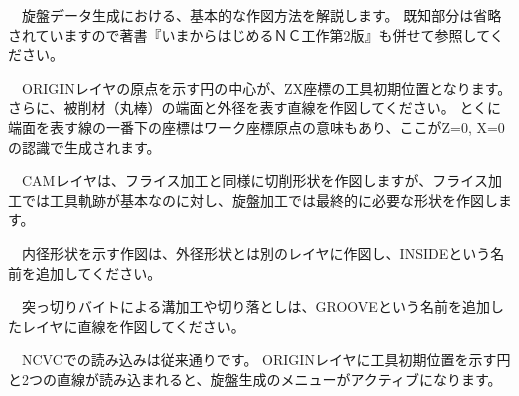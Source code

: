 

\vspace*{1zh}
　旋盤データ生成における、基本的な作図方法を解説します。
既知部分は省略されていますので著書『いまからはじめるＮＣ工作第2版』も併せて参照してください。


　ORIGINレイヤの原点を示す円の中心が、ZX座標の工具初期位置となります。
さらに、被削材（丸棒）の端面と外径を表す直線を作図してください。
とくに端面を表す線の一番下の座標はワーク座標原点の意味もあり、ここがZ=0, X=0の認識で生成されます。

　CAMレイヤは、フライス加工と同様に切削形状を作図しますが、フライス加工では工具軌跡が基本なのに対し、旋盤加工では最終的に必要な形状を作図します。

　内径形状を示す作図は、外径形状とは別のレイヤに作図し、INSIDEという名前を追加してください。

　突っ切りバイトによる溝加工や切り落としは、GROOVEという名前を追加したレイヤに直線を作図してください。

　NCVCでの読み込みは従来通りです。
ORIGINレイヤに工具初期位置を示す円と2つの直線が読み込まれると、旋盤生成のメニューがアクティブになります。

